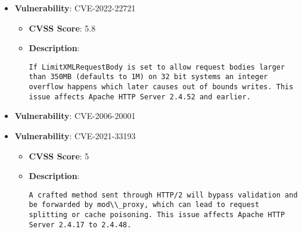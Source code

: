 \documentclass{article}
\begin{document}
\begin{itemize}
\begin{itemize}
{|
            }
        \end{itemize}
    
        \item \textbf{Vulnerability}: CVE-2022-22721
        \begin{itemize}
            \item \textbf{CVSS Score}:  5.8 
            \item \textbf{Description}:
            \parbox[t]{0.9\linewidth}{
                \verb|If LimitXMLRequestBody is set to allow request bodies larger than 350MB (defaults to 1M) on 32 bit systems an integer overflow happens which later causes out of bounds writes. This issue affects Apache HTTP Server 2.4.52 and earlier.|
            }
        \end{itemize}
    
        \item \textbf{Vulnerability}: CVE-2006-20001
    
        \item \textbf{Vulnerability}: CVE-2021-33193
        \begin{itemize}
            \item \textbf{CVSS Score}:  5 
            \item \textbf{Description}:
            \parbox[t]{0.9\linewidth}{
                \verb|A crafted method sent through HTTP/2 will bypass validation and be forwarded by mod\\_proxy, which can lead to request splitting or cache poisoning. This issue affects Apache HTTP Server 2.4.17 to 2.4.48.|
            }
        \end{itemize}
    

\end{itemize}
\end{document}
